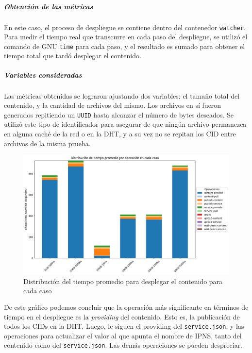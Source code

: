 \subparagraph{Obtención de las métricas} En este caso, el proceso de despliegue se contiene dentro del contenedor \texttt{watcher}. Para medir el tiempo real que transcurre en cada paso del despliegue, se utilizó el comando de GNU \texttt{time} para cada paso, y el resultado es sumado para obtener el tiempo total que tardó desplegar el contenido.

\subparagraph{Variables consideradas} Las métricas obtenidas se lograron ajustando dos variables: el tamaño total del contenido, y la cantidad de archivos del mismo. Los archivos en sí fueron generados repitiendo un \texttt{UUID} hasta alcanzar el número de bytes deseados. Se utilizó este tipo de identificador para asegurar de que ningún archivo permanezca en alguna caché de la red o en la DHT, y a su vez no se repitan los CID entre archivos de la misma prueba.

\begin{figure}[H]
    \centering
    \includegraphics[width=1\linewidth]{img/metricas-ipfs/metricas-ipfs-caso1-1.png}
    \caption{Distribución del tiempo promedio para desplegar el contenido para cada caso}
    \label{fig:metricas-ipfs-caso1-1.png}
\end{figure}

De este gráfico podemos concluir que la operación más significante en términos de tiempo en el despliegue es la \textit{providing} del contenido. Esto es, la publicación de todos los CIDs en la DHT. Luego, le siguen el providing del \texttt{service.json}, y las operaciones para actualizar el valor al que apunta el nombre de IPNS, tanto del contenido como del \texttt{service.json}. Las demás operaciones se pueden despreciar.



